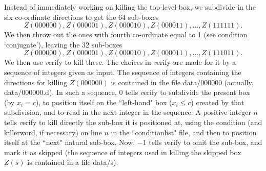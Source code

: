 \begin{construction}
Instead of immediately working on killing the top-level box, we subdivide in the six co-ordinate directions to get the 64 sub-boxes $$Z(000000),Z(000001),Z(000010),Z(000011),\ldots, Z(111111).$$ 
\noindent We then throw out
the ones with fourth co-ordinate equal to 1 (see condition `conjugate'), leaving  the 32 sub-boxes
$$Z(000000),Z(000001),Z(000010),Z(000011),\ldots, Z(111011).$$  \noindent We then use {\textit verify} to kill these.
\vskip 8pt
The choices in {\textit verify} are made for it by a sequence
of integers given as input.  The sequence of integers containing the directions for killing $Z(000000)$ is contained in the file data/000000 (actually, data/000000.d).
In such a sequence, 
$0$ tells {\textit verify} to subdivide the present box (by $x_i = c$),  to position itself on the ``left-hand" box ($x_i \le c$)
created by that subdivision, and to read in the next integer in the sequence. A  positive integer $n$ tells {\textit verify} to
kill directly the sub-box it is positioned at, using the condition (and killerword, if necessary) on line $n$ in the
``conditionlist" file,  and then to position itself at the ``next" natural sub-box.  Now,
$-1$ tells {\textit verify} to omit the sub-box, and mark it as skipped
(the sequence of integers used in killing the skipped box $Z(s)$ is contained in a file data/s).\end{construction}


